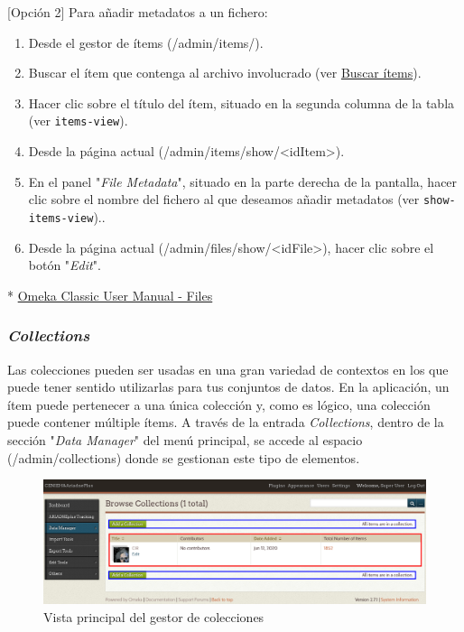 \documentclass[
]{article}
\providecommand{\tightlist}{%
  \setlength{\itemsep}{0pt}\setlength{\parskip}{0pt}}
\begin{document}
{[}Opción 2{]} Para añadir metadatos a un fichero:

\begin{enumerate}
\def\labelenumi{\arabic{enumi}.}
\tightlist
\item
  Desde el gestor de ítems ({/admin/items/}).
\item
  Buscar el ítem que contenga al archivo involucrado (ver
  \protect\hyperlink{buscar-uxedtems}{Buscar ítems}).
\item
  Hacer clic sobre el título del ítem, situado en la segunda columna de
  la tabla (ver \texttt{items-view}).
\item
  Desde la página actual
  ({/admin/items/show/\textless idItem\textgreater{}}).
\item
  En el panel "\emph{File Metadata}", situado en la parte derecha de la
  pantalla, hacer clic sobre el nombre del fichero al que deseamos
  añadir metadatos (ver \texttt{show-items-view})..
\item
  Desde la página actual
  ({/admin/files/show/\textless idFile\textgreater{}}), hacer clic sobre
  el botón "\emph{Edit}".
\end{enumerate}

* \href{https://omeka.org/classic/docs/Content/Files/}{Omeka Classic
User Manual - Files}

\hypertarget{collections}{%
\subsubsection{\texorpdfstring{\emph{Collections}}{Collections}}\label{collections}}

Las colecciones pueden ser usadas en una gran variedad de contextos en
los que puede tener sentido utilizarlas para tus conjuntos de datos. En
la aplicación, un ítem puede pertenecer a una única colección y, como es
lógico, una colección puede contener múltiple ítems. A través de la
entrada \emph{Collections}, dentro de la sección "\emph{Data Manager}"
del menú principal, se accede al espacio ({/admin/collections}) donde se
gestionan este tipo de elementos.

\begin{figure}
\hypertarget{collections-view}{%
\centering
\includegraphics{../_static/images/collections-view.png}
\caption{Vista principal del gestor de
colecciones}\label{collections-view}
}
\end{figure}
\end{document}
